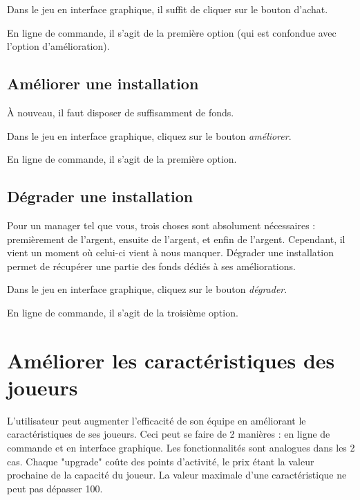 Dans le jeu en interface graphique, il suffit de cliquer sur le bouton d'achat.

En ligne de commande, il s'agit de la première option (qui est confondue avec l'option d'amélioration).

\subsection{Améliorer une installation}
À nouveau, il faut disposer de suffisamment de fonds.

Dans le jeu en interface graphique, cliquez sur le bouton \emph{améliorer}.

En ligne de commande, il s'agit de la première option.

\subsection{Dégrader une installation}
Pour un manager tel que vous, trois choses sont absolument nécessaires : premièrement de l'argent,
ensuite de l'argent, et enfin de l'argent. Cependant, il vient un moment où celui-ci vient à nous 
manquer. Dégrader une installation permet de récupérer une partie des fonds dédiés à ses améliorations.

Dans le jeu en interface graphique, cliquez sur le bouton \emph{dégrader}.

En ligne de commande, il s'agit de la troisième option.

\section{Améliorer les caractéristiques des joueurs}
L'utilisateur peut augmenter l'efficacité de son équipe en améliorant le caractéristiques de ses joueurs. Ceci peut se faire de 2 manières : en ligne de commande et en interface graphique.
Les fonctionnalités sont analogues dans les 2 cas. Chaque "upgrade" coûte des points d'activité, le prix étant la valeur prochaine de la capacité du joueur. 
La valeur maximale d'une caractéristique ne peut pas dépasser  100.
